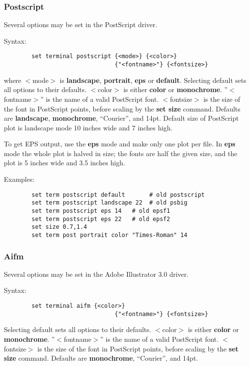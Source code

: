 \subsubsection{Postscript}
Several options may be set in the PostScript driver.

Syntax:
\begin{verbatim}
        set terminal postscript {<mode>} {<color>}
                                {"<fontname>"} {<fontsize>}
\end{verbatim}

where $<$mode$>$ is {\bf landscape}, {\bf portrait}, {\bf eps} or {\bf default}. 
Selecting default sets all options to their defaults.
$<$color$>$ is either {\bf color} or {\bf monochrome}.
''$<$fontname$>$'' is the name of a valid PostScript font.
$<$fontsize$>$ is the size of the font in PostScript points, before 
scaling by the {\bf set size} command.
Defaults are {\bf landscape}, {\bf monochrome}, ``Courier'', and 14pt.
Default size of PostScript plot is landscape mode 10 inches wide 
and 7 inches high.

To get EPS output, use the {\bf eps} mode and make only one plot per file.
In {\bf eps} mode the whole plot is halved in size; the fonts are half the 
given size, and the plot is 5 inches wide and 3.5 inches high.

Examples:

\begin{verbatim}
        set term postscript default       # old postscript
        set term postscript landscape 22  # old psbig
        set term postscript eps 14   # old epsf1
        set term postscript eps 22   # old epsf2
        set size 0.7,1.4
        set term post portrait color "Times-Roman" 14 
\end{verbatim}

\subsubsection{Aifm}
Several options may be set in the Adobe Illustrator 3.0 driver.

Syntax:
\begin{verbatim}
        set terminal aifm {<color>}
                                {"<fontname>"} {<fontsize>}
\end{verbatim}

Selecting default sets all options to their defaults.
$<$color$>$ is either {\bf color} or {\bf monochrome}.
''$<$fontname$>$'' is the name of a valid PostScript font.
$<$fontsize$>$ is the size of the font in PostScript points, before 
scaling by the {\bf set size} command.
Defaults are {\bf monochrome}, ``Courier'', and 14pt.

